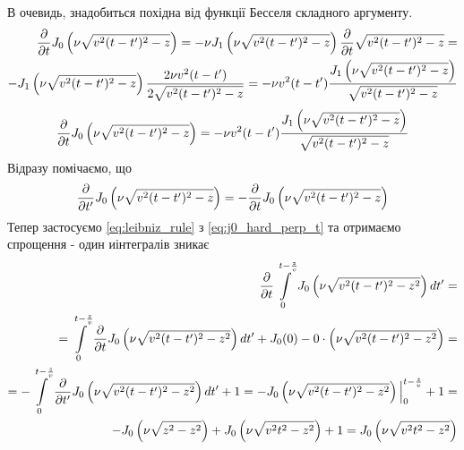 %
В очевидь, знадобиться похідна від функції Бесселя складного аргументу.
%
\textcolor{lightgray} { \begin{equation*} \begin{aligned}
\frac{\partial }{\partial t} J_0 \left( \nu \sqrt{v^2 (t-t')^2 - z} \right) = 
- \nu J_1 \left( \nu \sqrt{v^2 (t-t')^2 - z} \right) 
\frac{\partial }{\partial t} \sqrt{v^2 (t-t')^2 - z} = \\
-  J_1 \left( \nu \sqrt{v^2 (t-t')^2 - z} \right)
\frac{2 \nu v^2 (t-t')}{2 \sqrt{v^2 (t-t')^2 - z}} = - \nu v^2 (t-t') 
\frac{J_1 \left( \nu \sqrt{v^2 (t-t')^2 - z} \right)}
     {\sqrt{v^2 (t-t')^2 - z}}
\end{aligned} \end{equation*} }
%
\begin{equation*} \begin{aligned}
\frac{\partial }{\partial t} J_0 \left( \nu \sqrt{v^2 (t-t')^2 - z} \right) = - \nu v^2 (t-t') 
\frac{J_1 \left( \nu \sqrt{v^2 (t-t')^2 - z} \right)}{\sqrt{v^2 (t-t')^2 - z}}
\end{aligned} \end{equation*}
%
Відразу помічаємо, що
%
\begin{equation} \begin{aligned} \label{eq:j0_hard_perp_t}
\frac{\partial }{\partial t'} J_0 \left( \nu \sqrt{v^2 (t-t')^2 - z} \right) =
- \frac{\partial }{\partial t} J_0 \left( \nu \sqrt{v^2 (t-t')^2 - z} \right) 
\end{aligned} \end{equation}
%
Тепер застосуємо \eqref{eq:leibniz_rule} з \eqref{eq:j0_hard_perp_t} та 
отримаємо спрощення - один иінтегралів зникає
%
\textcolor{lightgray} { \begin{equation*} \begin{aligned}
\frac{\partial }{\partial t} \int \limits_{0}^{t - \frac{z}{v}} 
J_0 \left( \nu \sqrt{v^2 (t-t')^2 - z^2} \right) dt' = \\
= \int \limits_{0}^{t - \frac{z}{v}} 
\frac{\partial }{\partial t} J_0 \left( \nu \sqrt{v^2 (t-t')^2 - z^2} \right) dt' +
J_0 (0) - 0 \cdot \left( \nu \sqrt{v^2 (t-t')^2 - z^2} \right) = \\
= - \int \limits_{0}^{t - \frac{z}{v}} 
\frac{\partial }{\partial t'} J_0 \left( \nu \sqrt{v^2 (t-t')^2 - z^2} \right) dt' + 1 =
- \Big. J_0 \left( \nu \sqrt{v^2 (t-t')^2 - z^2} \right) \Big|_{0}^{t - \frac{z}{v}} + 1 = \\
- J_0 \left( \nu \sqrt{z^2 - z^2} \right) + J_0 \left( \nu \sqrt{v^2 t^2 - z^2} \right) + 1 = 
J_0 \left( \nu \sqrt{v^2 t^2 - z^2} \right)
\end{aligned} \end{equation*} }
